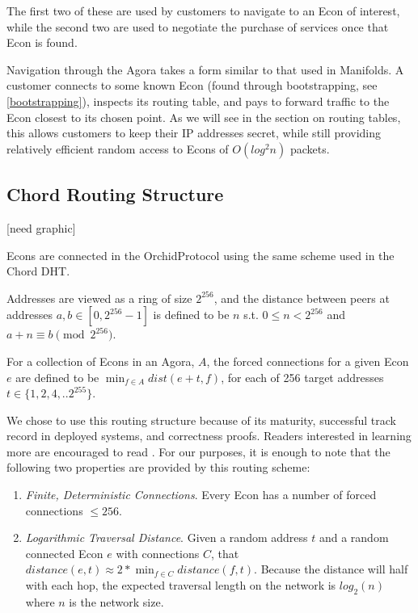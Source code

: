 \documentclass{article}
\newcommand{\orchid}{Orchid}
\newcommand{\Orchid}{\orchid}
\begin{document}
The first two of these are used by customers to navigate to an Econ of
interest, while the second two are used to negotiate the purchase of
services once that Econ is found.

Navigation through the Agora takes a form similar to that used in
Manifolds. A customer connects to some known Econ (found through
bootstrapping, see \ref{bootstrapping}), inspects its routing table,
and pays to forward traffic to the Econ closest to its chosen
point. As we will see in the section on routing tables, this allows
customers to keep their IP addresses secret, while still providing
relatively efficient random access to Econs of $O(log^2 n)$ packets.

\subsection{Chord Routing Structure}

[need graphic]

Econs are connected in the \Orchid Protocol using the same scheme used
in the Chord DHT.

Addresses are viewed as a ring of size $2^{256}$, and the distance
between peers at addresses $a, b \in [0, 2^{256}-1]$ is defined to be
$n$ s.t. $0 \leq n < 2^{256}$ and $a + n \equiv b \pmod{2^{256}}$.

For a collection of Econs in an Agora, $A$, the forced connections for
a given Econ $e$ are defined to be $\min_{f \in A} dist(e+t, f)$, for
each of 256 target addresses $t \in \{1, 2, 4, .. 2^{255}\}$.

We chose to use this routing structure because of its maturity,
successful track record in deployed systems, and correctness
proofs. Readers interested in learning more are encouraged to read
\cite{CHORD}. For our purposes, it is enough to note that the following
two properties are provided by this routing scheme:

\begin{enumerate}
\item \emph{Finite, Deterministic Connections}. Every Econ has a
  number of forced connections $\leq 256$.
\item \emph{Logarithmic Traversal Distance}. Given a random address
  $t$ and a random connected Econ $e$ with connections $C$, that
  $distance(e, t) \approx 2 * \min_{f \in C} distance(f, t)$. Because
  the distance will half with each hop, the expected traversal length
  on the network is $log_2(n)$ where $n$ is the network size.
\end{enumerate}
\end{document}
